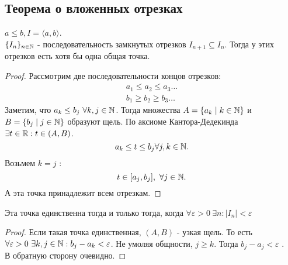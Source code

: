 \documentclass[12pt]{report}
\begin{document}
\subsection{Теорема о вложенных отрезках}\label{ques_10}
\begin{thm}\label{thm_nested_segment}
    $a \le b, I = \langle a, b \rangle$.\\
    $\{I_n\}_{n \in \mathbb{N}}$ - последовательность замкнутых отрезков $I_{n+1} \subseteq I_n$. Тогда у этих отрезков есть хотя бы одна общая точка.
\end{thm}
\begin{proof}
    Рассмотрим две последовательности концов отрезков:
     \[
	 \begin{array}{c}
         a_1 \le a_2 \le a_3 \ldots \\
	 b_1 \ge b_2 \ge b_3 \ldots 
     \end{array}
     \] 
     Заметим, что  $a_k \le b_j ~ \forall k, j \in \mathbb{N}$. Тогда множества $A = \{a_k \mid k \in \mathbb{N}\}$ и $B=\{b_j \mid j \in \mathbb{N}\}$ образуют щель. По аксиоме Кантора-Дедекинда $\exists t \in \mathbb{R} : t \in (A, B)$.
     \[
     a_k \le t \le b_j \forall j, k \in \mathbb{N}
     .\] 
     Возьмем $k = j$ :
     \[
	 t \in [a_j, b_j], ~ \forall j \in \mathbb{N}
     .\] 
     А эта точка принадлежит всем отрезкам.
\end{proof}
\begin{note}
    Эта точка единственна тогда и только тогда, когда $\forall \varepsilon > 0 ~\exists n : |I_n| < \varepsilon $
\end{note}
\begin{proof}
    Если такая точка единственная, $(A, B)$ - узкая щель. То есть $\forall \varepsilon >0 ~\exists k, j \in \mathbb{N}: b_j - a_k < \varepsilon $. Не умоляя общности, $j \ge k$. Тогда $b_j - a_j < \varepsilon $ . \\
    В обратную сторону очевидно. 
\end{proof}
\end{document}
